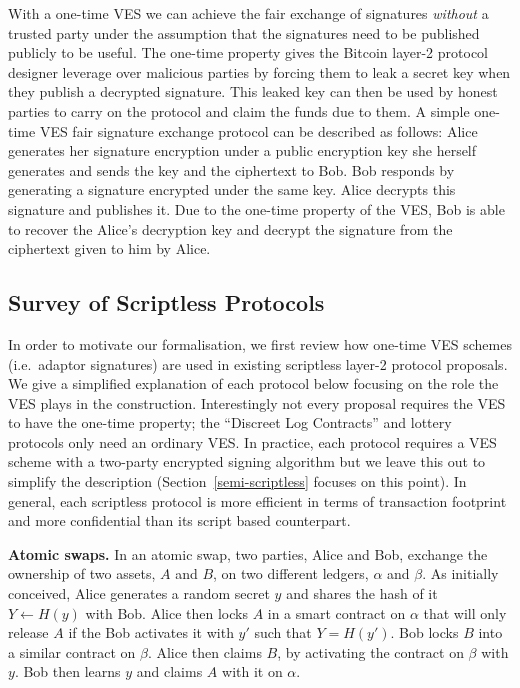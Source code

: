 \documentclass[fullpage]{article}
\theoremstyle{definition}
\begin{document}
With a one-time VES we can achieve the fair exchange of signatures \emph{without} a trusted party under the assumption that the signatures need to be published publicly to be useful. The one-time property gives the Bitcoin layer-2 protocol designer leverage over malicious parties by forcing them to leak a secret key when they publish a decrypted signature. This leaked key can then be used by honest parties to carry on the protocol and claim the funds due to them. A simple one-time VES fair signature exchange protocol can be described as follows: Alice generates her signature encryption under a public encryption key she herself generates and sends the key and the ciphertext to Bob. Bob responds by generating a signature encrypted under the same key. Alice decrypts this signature and publishes it. Due to the one-time property of the VES, Bob is able to recover the Alice's decryption key and decrypt the signature from the ciphertext given to him by Alice.


\subsection{Survey of Scriptless Protocols}
\label{exisitng-protocols}

In order to motivate our formalisation, we first review how one-time VES schemes (i.e.\ adaptor signatures) are used in existing scriptless layer-2 protocol proposals. We give a simplified explanation of each protocol below focusing on the role the VES plays in the construction. Interestingly not every proposal requires the VES to have the one-time property; the ``Discreet Log Contracts'' and lottery protocols only need an ordinary VES\@. In practice, each protocol requires a VES scheme with a two-party encrypted signing algorithm but we leave this out to simplify the description (Section~\ref{semi-scriptless} focuses on this point). In general, each scriptless protocol is more efficient in terms of transaction footprint and more confidential than its script based counterpart.

\hfill \break \textbf{Atomic swaps.}  In an atomic swap, two parties, Alice and Bob, exchange the ownership of two assets, $A$ and $B$, on two different ledgers, $\alpha$ and $\beta$. As initially conceived\cite{atomic-swap}, Alice generates a random secret $y$ and shares the hash of it $Y \gets H(y)$ with Bob. Alice then locks $A$ in a smart contract on $\alpha$ that will only release $A$ if the Bob activates it with $y'$ such that $Y = H(y')$. Bob locks $B$ into a similar contract on $\beta$. Alice then claims $B$, by activating the contract on $\beta$ with $y$. Bob then learns $y$ and claims $A$ with it on $\alpha$.
\end{document}
